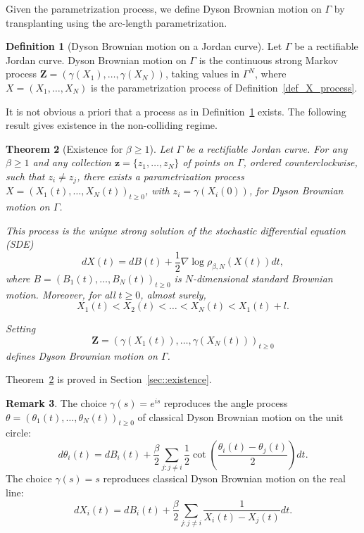 \documentclass[11pt]{article}
\numberwithin{equation}{section}
\newtheorem{theorem}{Theorem}[section]
\theoremstyle{definition}
\newtheorem{definition}[theorem]{Definition}
\newtheorem{remark}[theorem]{Remark}
\begin{document}
    Given the parametrization process, we define Dyson Brownian motion on $\Gamma$ by transplanting using the arc-length parametrization.
    \begin{definition}[Dyson Brownian motion on a Jordan curve]\label{def_Dyson_BM_contour} Let $\Gamma$ be a rectifiable Jordan curve. Dyson Brownian motion on $\Gamma$ is the continuous strong Markov process $\boldsymbol{Z}=(\gamma(X_{1}),\dots,\gamma(X_{N}))$, taking values in $\Gamma^{N}$, where $X=(X_{1},\dots,X_{N})$ is the parametrization process of Definition~\ref{def_X_process}. 
    \end{definition}
It is not obvious a priori that a process as in Definition~\ref{def_Dyson_BM_contour} exists. The following result gives existence in the non-colliding regime.
\begin{theorem}[Existence for $\beta \ge 1$]\label{thm:existence-intro}
    Let $\Gamma$ be a rectifiable Jordan curve. For any $\beta\ge 1$ and any collection $\boldsymbol{z} =\{z_{1},\dots, z_{N}\}$ of points on $\Gamma$, ordered counterclockwise, such that $z_{i}\neq z_{j}$, there exists a parametrization process $X = (X_{1}(t), \dots,X_{N}(t))_{t\ge 0}$, with $z_{i} = \gamma(X_{i}(0))$, for Dyson Brownian motion on $\Gamma$. 
    
    This process is the unique strong solution of the stochastic differential equation (SDE)
    \[
        dX(t) = dB(t) + \frac{1}{2}\nabla\log\rho_{\beta,N}(X(t))dt,
    \]
    where $B = (B_1(t), \ldots, B_N(t))_{t \ge 0}$ is $N$-dimensional standard Brownian motion. Moreover, for all $t\ge 0$, almost surely,
    \[
        X_{1}(t)<X_{2}(t)<\dots < X_{N}(t)<X_{1}(t)+l.
    \]
    
    Setting
    \[
        \boldsymbol{Z} = (\gamma(X_{1}(t)), \dots,\gamma(X_{N}(t)))_{t\ge 0}
    \]
    defines Dyson Brownian motion on $\Gamma$.
\end{theorem}
\noindent Theorem~\ref{thm:existence-intro} is proved in Section~\ref{sec::existence}. 
\begin{remark}
    The choice $\gamma(s)=e^{is}$ reproduces the angle process $\theta = (\theta_{1}(t),\dots,\theta_{N}(t))_{t\ge 0}$ of classical Dyson Brownian motion on the unit circle:
    \[
        d\theta_{i}(t) 
        = dB_{i}(t) + \frac{\beta}{2}\sum\limits_{j:j\neq i}\frac{1}{2}\cot\left(\frac{\theta_{i}(t)-\theta_{j}(t)}{2}\right)dt.
    \]
    The choice $\gamma(s)=s$ reproduces classical Dyson Brownian motion on the real line:
    \[
        dX_{i}(t) = dB_{i}(t) + \frac{\beta}{2}\sum\limits_{j:j\neq i}\frac{1}{X_{i}(t)-X_{j}(t)}dt.
    \]
  \end{remark}
\end{document}
